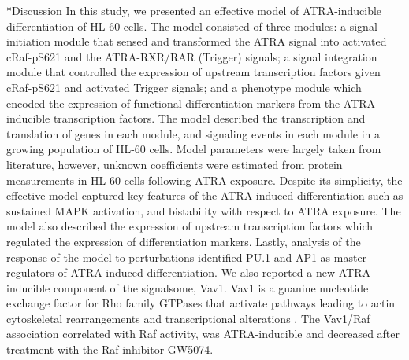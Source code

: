 \documentclass[12pt]{article}
\makeatletter
\renewcommand\section{\@startsection
	{subsection}{2}{0mm}
	{-0.2in}
	{0.05\baselineskip}
	{\normalfont\large\bfseries}}
\makeatother
\begin{document}
\clearpage


\section*{Discussion}
In this study, we presented an effective model of ATRA-inducible differentiation of HL-60 cells.
The model consisted of three modules: a signal initiation module that sensed and transformed the ATRA signal into activated cRaf-pS621 and the ATRA-RXR/RAR (Trigger) signals;
a signal integration module that controlled the expression of upstream transcription factors given cRaf-pS621 and activated Trigger signals; and
a phenotype module which encoded the expression of functional differentiation markers from the ATRA-inducible transcription factors.
The model described the transcription and translation of genes in each module, and signaling events in each module in a growing population of HL-60 cells.
Model parameters were largely taken from literature, however, unknown coefficients were estimated from protein measurements in HL-60 cells following ATRA exposure.
Despite its simplicity, the effective model captured key features of the ATRA induced differentiation such as
sustained MAPK activation, and bistability with respect to ATRA exposure.
The model also described the expression of upstream transcription factors which regulated the expression of differentiation markers.
Lastly, analysis of the response of the model to perturbations identified PU.1 and AP1 as master regulators of ATRA-induced differentiation.
We also reported a new ATRA-inducible component of the signalsome, Vav1.
Vav1 is a guanine nucleotide exchange factor for Rho family GTPases that activate pathways leading to actin cytoskeletal rearrangements and transcriptional alterations \cite{Hornstein:2004aa}.
The Vav1/Raf association correlated with Raf activity, was ATRA-inducible and decreased after treatment with the Raf inhibitor GW5074.
\end{document}
